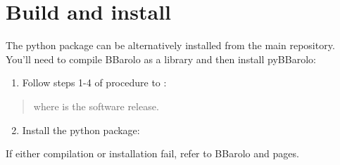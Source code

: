 \documentclass[letterpaper,10pt,english]{sphinxmanual}
\begin{document}
\section{Build and install}
\label{\detokenize{pybb_install:build-and-install}}
The python package can be alternatively installed from the main repository. You’ll need to compile BBarolo as a library and then install pyBBarolo:
\begin{enumerate}
\item {} 
Follow steps 1-4 of procedure to {\hyperref[\detokenize{installing:compiling}]{}}:

\begin{sphinxVerbatim}[commandchars=\\\{\}]
   
      
 
 
\end{sphinxVerbatim}

\end{enumerate}
\begin{quote}

where  is the software release.
\end{quote}
\begin{enumerate}
\setcounter{enumi}{1}
\item {} 
Install the python package:

\begin{sphinxVerbatim}[commandchars=\\\{\}]
   
\end{sphinxVerbatim}

\end{enumerate}

If either compilation or installation fail, refer to BBarolo {\hyperref[\detokenize{installing:compiling}]{}} and {\hyperref[\detokenize{troubleshooting:troubleshooting}]{}} pages.
\end{document}
